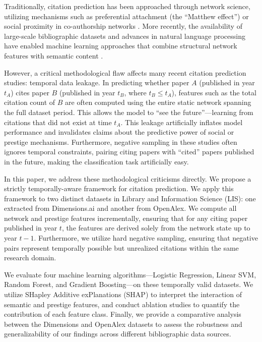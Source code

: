 \documentclass[12pt,a4paper]{article}
\begin{document}
Traditionally, citation prediction has been approached through network science, utilizing mechanisms such as preferential attachment (the ``Matthew effect'') \cite{merton1968matthew, de1976general, barabasi1999emergence} or social proximity in co-authorship networks \cite{newman2004coauthorship}. More recently, the availability of large-scale bibliographic datasets and advances in natural language processing have enabled machine learning approaches that combine structural network features with semantic content \cite{chakraborty2015towards, shibata2012link}.

However, a critical methodological flaw affects many recent citation prediction studies: temporal data leakage. In predicting whether paper $A$ (published in year $t_A$) cites paper $B$ (published in year $t_B$, where $t_B \le t_A$), features such as the total citation count of $B$ are often computed using the entire static network spanning the full dataset period. This allows the model to ``see the future''---learning from citations that did not exist at time $t_A$. This leakage artificially inflates model performance and invalidates claims about the predictive power of social or prestige mechanisms. Furthermore, negative sampling in these studies often ignores temporal constraints, pairing citing papers with ``cited'' papers published in the future, making the classification task artificially easy.

In this paper, we address these methodological criticisms directly. We propose a strictly temporally-aware framework for citation prediction. We apply this framework to two distinct datasets in Library and Information Science (LIS): one extracted from Dimensions.ai \cite{herzog2020dimensions} and another from OpenAlex. We compute all network and prestige features incrementally, ensuring that for any citing paper published in year $t$, the features are derived solely from the network state up to year $t-1$. Furthermore, we utilize hard negative sampling, ensuring that negative pairs represent temporally possible but unrealized citations within the same research domain.

We evaluate four machine learning algorithms---Logistic Regression, Linear SVM, Random Forest, and Gradient Boosting---on these temporally valid datasets. We utilize SHapley Additive exPlanations (SHAP) to interpret the interaction of semantic and prestige features, and conduct ablation studies to quantify the contribution of each feature class. Finally, we provide a comparative analysis between the Dimensions and OpenAlex datasets to assess the robustness and generalizability of our findings across different bibliographic data sources.
\end{document}
